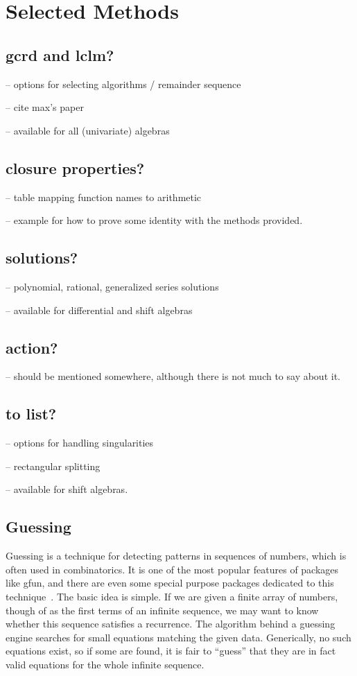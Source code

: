 \documentclass{amsart}
\begin{document}
\section{Selected Methods}\label{sec:4}

\subsection{gcrd and lclm?}

-- options for selecting algorithms / remainder sequence

-- cite max's paper

-- available for all (univariate) algebras

\subsection{closure properties?}

-- table mapping function names to arithmetic

-- example for how to prove some identity with the methods provided. 

\subsection{solutions?}

-- polynomial, rational, generalized series solutions

-- available for differential and shift algebras

\subsection{action?}

-- should be mentioned somewhere, although there is not much to say about it. 

\subsection{to list?}

-- options for handling singularities

-- rectangular splitting

-- available for shift algebras. 

\subsection{Guessing}

Guessing is a technique for detecting patterns in sequences of numbers, which is
often used in combinatorics. It is one of the most popular features of packages
like gfun, and there are even some special purpose packages dedicated to this
technique~\cite{kauers09a,hebisch11}.  The basic idea is simple. If we are given
a finite array of numbers, though of as the first terms of an infinite sequence,
we may want to know whether this sequence satisfies a recurrence. The algorithm
behind a guessing engine searches for small equations matching the given data.
Generically, no such equations exist, so if some are found, it is fair to
``guess'' that they are in fact valid equations for the whole infinite sequence.
\end{document}
